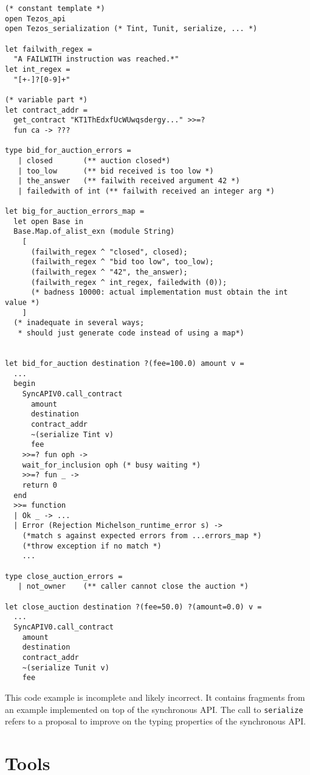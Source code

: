 \documentclass[a4paper]{llncs}
\begin{document}
\begin{lstlisting}[caption={Generated implementation},label={lst:generated-implementation}]
(* constant template *)
open Tezos_api
open Tezos_serialization (* Tint, Tunit, serialize, ... *)

let failwith_regex = 
  "A FAILWITH instruction was reached.*"
let int_regex = 
  "[+-]?[0-9]+"

(* variable part *)
let contract_addr = 
  get_contract "KT1ThEdxfUcWUwqsdergy..." >>=? 
  fun ca -> ???

type bid_for_auction_errors = 
   | closed       (** auction closed*)
   | too_low      (** bid received is too low *)
   | the_answer   (** failwith received argument 42 *)
   | failedwith of int (** failwith received an integer arg *)

let big_for_auction_errors_map =
  let open Base in
  Base.Map.of_alist_exn (module String)
    [
      (failwith_regex ^ "closed", closed);
      (failwith_regex ^ "bid too low", too_low);
      (failwith_regex ^ "42", the_answer);
      (failwith_regex ^ int_regex, failedwith (0)); 
      (* badness 10000: actual implementation must obtain the int value *)
    ]
  (* inadequate in several ways;
   * should just generate code instead of using a map*)
  

let bid_for_auction destination ?(fee=100.0) amount v =
  ...
  begin
    SyncAPIV0.call_contract
      amount
      destination
      contract_addr
      ~(serialize Tint v)
      fee
    >>=? fun oph ->
    wait_for_inclusion oph (* busy waiting *)
    >>=? fun _ ->
    return 0
  end
  >>= function
  | Ok _ -> ...
  | Error (Rejection Michelson_runtime_error s) -> 
    (*match s against expected errors from ...errors_map *)
    (*throw exception if no match *)
    ...

type close_auction_errors = 
   | not_owner    (** caller cannot close the auction *)

let close_auction destination ?(fee=50.0) ?(amount=0.0) v =
  ...
  SyncAPIV0.call_contract
    amount
    destination
    contract_addr
    ~(serialize Tunit v)
    fee
\end{lstlisting}
This code example is incomplete and likely incorrect. It contains
fragments from an example implemented on top of the synchronous API.
The call to \lstinline/serialize/ refers to a proposal to improve on
the typing properties of the synchronous API.

\clearpage
\section{Tools}
\label{sec:tools}
\end{document}
